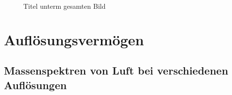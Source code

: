 \documentclass[10pt,a4paper]{article}
\begin{document}
	
\begin{figure}[h]
	\caption{Titel unterm gesamten Bild}
\end{figure}

\section{Auflösungsvermögen}

\subsection{Massenspektren von Luft bei verschiedenen Auflösungen}
\end{document}
